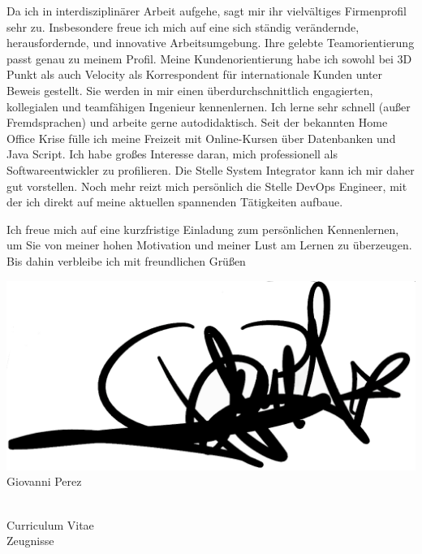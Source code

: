 \documentclass[a4paper,10pt]{article}
\begin{document}
\begin{page}{\textwidth}
Da ich in interdisziplinärer Arbeit aufgehe, sagt mir ihr vielvältiges Firmenprofil sehr zu. Insbesondere freue ich mich auf eine sich ständig verändernde, herausfordernde, und innovative Arbeitsumgebung. Ihre gelebte Teamorientierung passt genau zu meinem Profil. Meine Kundenorientierung habe ich sowohl bei 3D Punkt als auch Velocity als Korrespondent für internationale Kunden unter Beweis gestellt.\vfill
Sie werden in mir einen überdurchschnittlich engagierten, kollegialen und teamfähigen Ingenieur kennenlernen. Ich lerne sehr schnell (außer Fremdsprachen) und arbeite gerne autodidaktisch. Seit der bekannten Home Office Krise fülle ich meine Freizeit mit Online-Kursen über Datenbanken und Java Script. Ich habe großes Interesse daran, mich professionell als Softwareentwickler zu profilieren. Die Stelle System Integrator kann ich mir daher gut vorstellen. Noch mehr reizt mich persönlich die Stelle DevOps Engineer, mit der ich direkt auf meine aktuellen spannenden Tätigkeiten aufbaue. \vfill

Ich freue mich auf eine kurzfristige Einladung zum persönlichen Kennenlernen, um Sie von meiner
hohen Motivation und meiner Lust am Lernen zu überzeugen. Bis dahin verbleibe ich\vfill
mit freundlichen Grüßen



\begin{minipage}[c][3cm][b]{4cm}
	\includegraphics[width=0.7\linewidth]{pics/firma.png}
	\centering Giovanni Perez
\end{minipage}
\hfill
\begin{minipage}[c][3cm][b]{4cm}
\\ \hspace{0.5cm}
Curriculum Vitae\\ Zeugnisse
\end{minipage}


\end{page}
\pagebreak
\end{document}
